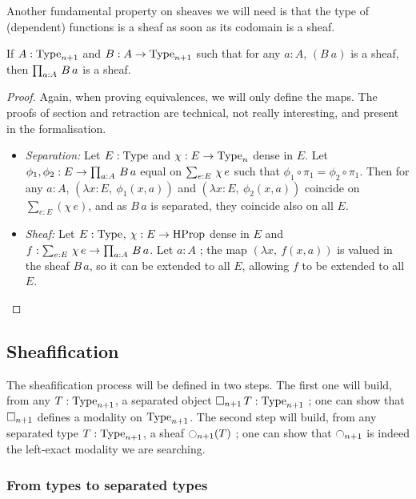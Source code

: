 Another fundamental property on sheaves we will need is that the type of (dependent)
functions is a sheaf as soon as its codomain is a sheaf.

\begin{prop}\label{prop:sheaf-forall}
  If $A:\operatorname{Type}_{n+1}$ and $B:A \to \operatorname{Type}_{n+1}$ such that for any
  $a:A$, $(B~a)$ is a sheaf, then $\prod_{a:A}\, B\, a$ is a sheaf.
\end{prop}
\begin{proof}
  Again, when proving equivalences, we will only define the maps. The
  proofs of section and retraction are technical, not really
  interesting, and present in the formalisation.
  \begin{itemize}
  \item {\em Separation:} Let $E:\operatorname{Type}$ and $\chi:E \to \operatorname{Type}_n$ dense
    in $E$. Let $\phi_1,\phi_2:E\to \prod_{a:A}\, B\, a$ equal on
    $\sum_{e:E}\, \chi\, e$ \ie{} such that $\phi_1\circ \pi_1 = \phi_2\circ
    \pi_1$.
    Then for any $a:A$, $(\lambda x:E,~\phi_1(x, a))$
    and $(\lambda x:E,~\phi_2(x,a))$
    coincide on $\sum_{e:E}(\chi\, e)$, and as $B\, a$ is separated,
    they coincide also on all $E$.
  \item {\em Sheaf:} Let $E:\operatorname{Type}$, $\chi:E\to \operatorname{HProp}$ dense in $E$ and
    $f:\sum_{e:E}\, \chi\, e\to \prod_{a:A}\, B\,a$. Let $a:A$ ; the
    map $(\lambda x,~f(x,a))$ is valued in the sheaf $B\, a$, so it
    can be extended to all $E$, allowing $f$ to be extended to all
    $E$.
  \end{itemize}
\end{proof}

\subsection{Sheafification}
\label{ssec:sheafification}

The sheafification process will be defined in two steps. The first
one will build, from any $T:\operatorname{Type}_{n+1}$, a separated object $\mathop{\square_{n+1}}
T:\operatorname{Type}_{n+1}$ ; one can show that $\mathop{\square_{n+1}}$ defines a modality on
$\operatorname{Type}_{n+1}$. The second step will build, from any separated type
$T:\operatorname{Type}_{n+1}$, a sheaf $\ocircle_{n+1}(T)$ ; one can show that
$\ocircle_{n+1}$ is indeed the left-exact modality we are searching.

\subsubsection{From types to separated types}
\label{sssec:type_to_sep}


